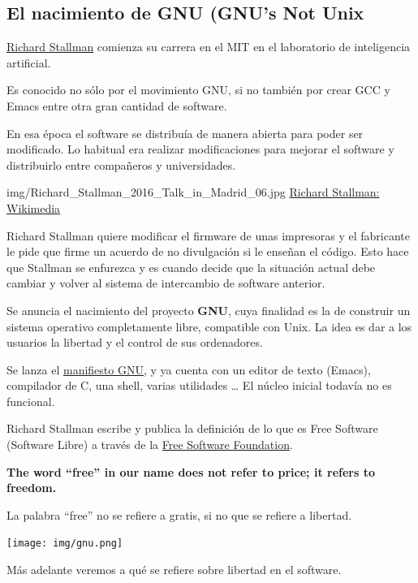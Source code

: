 \documentclass{../../../yukibook.cls/yukibook}
\begin{document}
\subsection{El nacimiento de GNU (GNU's Not Unix}
\begin{description}

\item[1971]\href{https://en.wikipedia.org/wiki/Richard_Stallman}{Richard Stallman} comienza su carrera en el MIT en el laboratorio de inteligencia artificial.

Es conocido no sólo por el movimiento GNU, si no también por crear GCC y Emacs entre otra gran cantidad de software.

En esa época el software se distribuía de manera abierta para poder ser modificado. Lo habitual era realizar modificaciones para mejorar el software y distribuirlo entre compañeros y universidades.

  {img/Richard_Stallman_2016_Talk_in_Madrid_06.jpg}
  {\href{https://commons.wikimedia.org/wiki/File:Richard_Stallman_2016_Talk_in_Madrid_06.jpg}{Richard Stallman: Wikimedia}}
  {
Richard Stallman quiere modificar el firmware de unas impresoras y el fabricante le pide que firme un acuerdo de no divulgación si le enseñan el código. Esto hace que Stallman se enfurezca y es cuando decide que la situación actual debe cambiar y volver al sistema de intercambio de software anterior.

\item[1983] Se anuncia el nacimiento del proyecto \textbf{GNU}, cuya finalidad es la de construir un sistema operativo completamente libre, compatible con Unix. La idea es dar a los usuarios la libertad y el control de sus ordenadores.

\item[1985] Se lanza el \href{https://www.gnu.org/gnu/manifesto.es.html}{manifiesto GNU}, y ya cuenta con un editor de texto (Emacs), compilador de C, una shell, varias utilidades … El núcleo inicial todavía no es funcional.
}


\item[1986]
Richard Stallman escribe y publica la definición de lo que es Free Software (Software Libre) a través de la \href{https://es.wikipedia.org/wiki/Free_Software_Foundation}{Free Software Foundation}.

\begin{tcolorbox}[title=Aclarando la palabra “free”:,sidebyside,righthand width=0.12\linewidth]

\textbf{The word “free” in our name does not refer to price; it refers to freedom.}

La palabra “free” no se refiere a gratis, si no que se refiere a libertad.

\tcblower
\texttt{[image: img/gnu.png]}
\end{tcolorbox}

Más adelante veremos a qué se refiere sobre libertad en el software.

\end{description}
\end{document}
